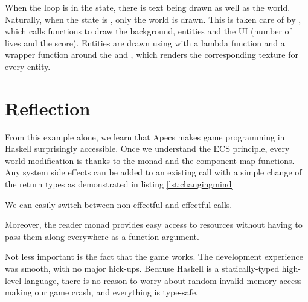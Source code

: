 \documentclass[
  digital, %
  color,   %
  table,   %
  oneside, %
  lof,     %
  lot,     %
]{fithesis3}
\begin{document}
When the loop is in the  state, there is text being drawn
as well as the world. Naturally, when the state is ,
only the world is drawn. This is taken care of by ,
which calls functions to draw the background, entities and the UI
(number of lives and the score). Entities are drawn using 
with a lambda function and a wrapper function around the  and
, which renders the corresponding texture for every entity.


\section{Reflection}
\label{sect:apecsreflection}

From this example alone,
we learn that Apecs makes game programming in Haskell surprisingly accessible.
Once we understand the ECS principle, every world modification is
 thanks to the  monad and
the component map functions. Any system side effects can be added
to an existing  call with a simple change of the return types
as demonstrated in listing \ref{lst:changingmind}
\begin{listing}[H]
\caption{We can easily switch between non-effectful and effectful calls.}
\label{lst:changingmind}
\end{listing}

Moreover, the  reader monad provides easy
access to resources without having to pass them along everywhere as a function argument.

Not less important is the fact that the game works.
The development experience was smooth, with no major hick-ups.
Because Haskell is a statically-typed high-level language, there is
no reason to worry about random invalid memory access making our game crash,
and everything is type-safe.
\end{document}
